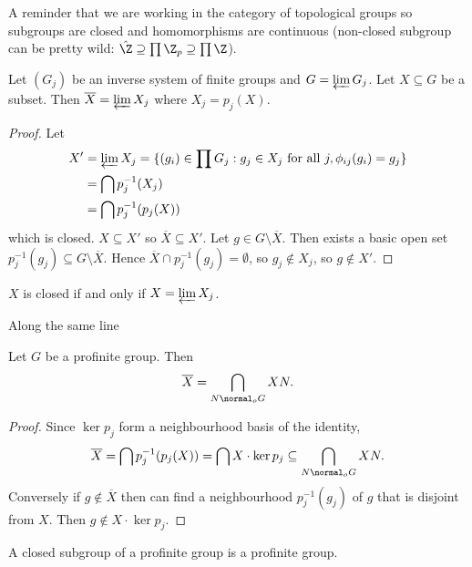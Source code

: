 \documentclass[a4paper]{article}
\begin{document}
A reminder that we are working in the category of topological groups so subgroups are closed and homomorphisms are continuous (non-closed subgroup can be pretty wild: \(\hat \Z \supseteq \prod \Z_p \supseteq \prod \Z\)).

\begin{proposition}
  Let \((G_j)\) be an inverse system of finite groups and \(G = \varprojlim G_j\). Let \(X \subseteq G\) be a subset. Then \(\overline X = \varprojlim X_j\) where \(X_j = p_j(X)\).
\end{proposition}

\begin{proof}
  Let
  \begin{align*}
    X'
    &= \varprojlim X_j
    = \{(g_i) \in \prod G_j: g_j \in X_j \text{ for all } j, \phi_{ij}(g_i) = g_j\} \\
    &= \bigcap p_j^{-1}(X_j) \\
    &= \bigcap p_j^{-1}(p_j(X))
  \end{align*}
  which is closed. \(X \subseteq X'\) so \(\overline X \subseteq X'\). Let \(g \in G \setminus \overline X\). Then exists a basic open set \(p_j^{-1}(g_j) \subseteq G \setminus \overline X\). Hence \(\overline X \cap p_j^{-1}(g_j) = \emptyset\), so \(g_j \notin X_j\), so \(g \notin X'\).
\end{proof}

\begin{corollary}
  \(X\) is closed if and only if \(X = \varprojlim X_j\).
\end{corollary}

Along the same line

\begin{proposition}
  Let \(G\) be a profinite group. Then
  \[
    \overline X = \bigcap_{N \normal_o G} XN.
  \]
\end{proposition}

\begin{proof}
  Since \(\ker p_j\) form a neighbourhood basis of the identity,
  \[
    \overline X = \bigcap p_j^{-1}(p_j(X)) = \bigcap X \cdot \ker p_j \subseteq \bigcap_{N \normal_o G} XN.
  \]
  Conversely if \(g \notin \overline X\) then can find a neighbourhood \(p_j^{-1}(g_j)\) of \(g\) that is disjoint from \(X\). Then \(g \notin X \cdot \ker p_j\).
\end{proof}

\begin{proposition}
  A closed subgroup of a profinite group is a profinite group.
\end{proposition}
\end{document}
